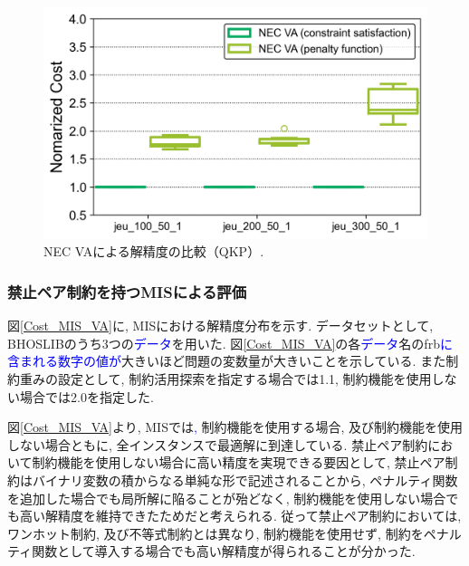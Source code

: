 \documentclass[submit,techrep,noauthor]{ipsj}
\begin{document}
\begin{figure}[tb]
\centering
\includegraphics[bb=0 0 700 230, width=15cm]{Cost_QKP_VA.png}
\caption{NEC VAによる解精度の比較（QKP）.}
\label{Cost_QKP_VA}
\end{figure}

\subsubsection{禁止ペア制約を持つMISによる評価}
図\ref{Cost_MIS_VA}に, MISにおける解精度分布を示す. データセットとして, BHOSLIB\cite{mislib}のうち3つの\textcolor{blue}{データ}を用いた. 図\ref{Cost_MIS_VA}の各\textcolor{blue}{データ}名のfrb\textcolor{blue}{に含まれる数字の値が}大きいほど問題の変数量が大きいことを示している. また制約重みの設定として, 制約活用探索を指定する場合では1.1, 制約機能を使用しない場合では2.0を指定した.

図\ref{Cost_MIS_VA}より, MISでは\textcolor{blue}{, }制約機能を使用する場合, 及び制約機能を使用しない場合ともに, 全インスタンスで最適解に到達している. 禁止ペア制約において制約機能を使用しない場合に高い精度を実現できる要因として, 禁止ペア制約はバイナリ変数の積からなる単純な形で記述されることから, ペナルティ関数を追加した場合でも局所解に陥ることが殆どなく, 制約機能を使用しない場合でも高い解精度を維持できたためだと考えられる. 従って禁止ペア制約においては, ワンホット制約, 及び不等式制約とは異なり, 制約機能を使用せず, 制約をペナルティ関数として導入する場合でも高い解精度が得られることが分かった.

\end{document}
